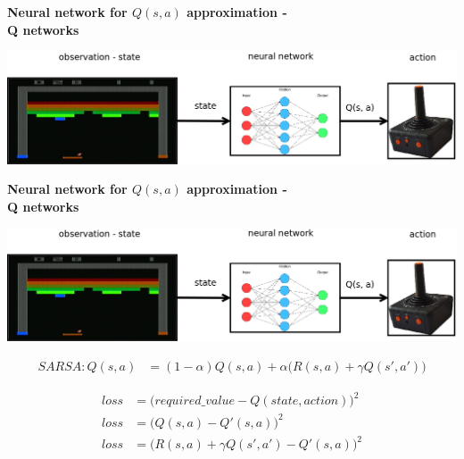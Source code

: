\documentclass[xcolor=dvipsnames]{beamer}
\begin{document}
\begin{frame}{\bf Neural network for $Q(s, a)$ approximation - \\ Q networks}

\centering
\includegraphics[scale=0.18]{../../diagrams/q_net.png}

\end{frame}

\begin{frame}{\bf Neural network for $Q(s, a)$ approximation - \\ Q networks}

\centering
\includegraphics[scale=0.15]{../../diagrams/q_net.png}

\begin{align*}
SARSA : Q(s, a) &= (1-\alpha)Q(s, a) + \alpha\Big(R(s, a) + \gamma Q(s', a')\Big)
\end{align*}

\begin{align*}
  loss   &= \Big(required\_value - Q(state, action)\Big)^2 \\
  loss   &= \Big(Q(s, a) - Q'(s, a)\Big)^2 \\
  loss   &= \Big(R(s, a) + \gamma Q(s', a') - Q'(s, a)\Big)^2
\end{align*}

\end{frame}
\end{document}
